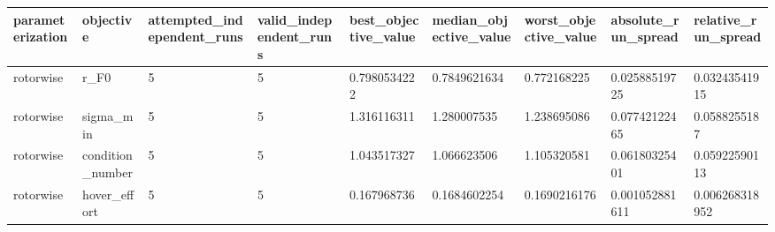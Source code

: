 \begin{tabular}{@{}lllllllll@{}}
\toprule
parameterization & objective & attempted\_independent\_runs & valid\_independent\_runs & best\_objective\_value & median\_objective\_value & worst\_objective\_value & absolute\_run\_spread & relative\_run\_spread \\
\midrule
rotorwise & r\_F0 & 5 & 5 & 0.7980534222 & 0.7849621634 & 0.772168225 & 0.02588519725 & 0.03243541915 \\
rotorwise & sigma\_min & 5 & 5 & 1.316116311 & 1.280007535 & 1.238695086 & 0.07742122465 & 0.0588255187 \\
rotorwise & condition\_number & 5 & 5 & 1.043517327 & 1.066623506 & 1.105320581 & 0.06180325401 & 0.05922590113 \\
rotorwise & hover\_effort & 5 & 5 & 0.167968736 & 0.1684602254 & 0.1690216176 & 0.001052881611 & 0.006268318952 \\
\bottomrule
\end{tabular}
